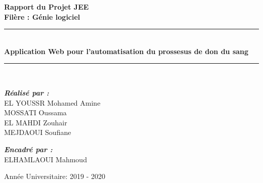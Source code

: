 \documentclass[12pt,a4paper,twoside]{report}
\begin{document}
	\begin{center}
			{\LARGE \textbf{Rapport du Projet JEE }}\\
			\textbf{Filère : Génie logiciel}
			\vspace{2cm}

			\rule{\linewidth}{0.6mm} \\[0.5cm]
				{ \huge \bfseries Application Web pour l'automatisation du prossesus de don du sang \\[0.4cm] }
			\rule{\linewidth}{0.6mm} \\[1cm]

			\vspace{2cm}

			\noindent
			\begin{minipage}[t]{.60\textwidth}
					\large
							\emph{\textbf{Réalisé par :}} \\
							EL YOUSSR Mohamed Amine\\
							 MOSSATI Oussama\\
							 EL MAHDI Zouhair\\
							 MEJDAOUI Soufiane\\
							
					
			\end{minipage}
			\begin{minipage}[t]{.30\textwidth}
						
							\emph{\textbf{Encadré par :}}\\
							 ELHAMLAOUI Mahmoud\\
						
			\end{minipage}

			\vfill

			\vspace{1.5cm}
			{\large Année Universitaire: 2019 - 2020 }
	\end{center}

	\newpage
	\thispagestyle{empty}
	\setcounter{page}{1}
		
	
	\newpage
		
				\listoffigures
		
		\newpage
			

	\printnomenclature

	\begingroup
\makeatletter

\tableofcontents{}

\endgroup
	
\end{document}
